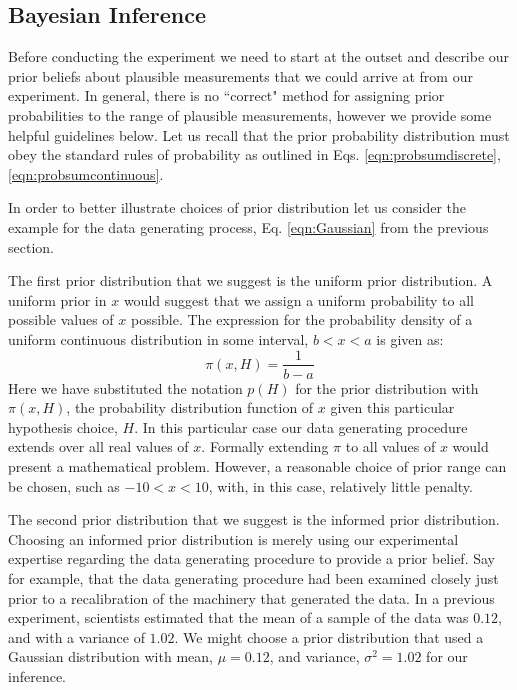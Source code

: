 \subsection{Bayesian Inference}
Before conducting the experiment we need to start at the outset and describe our prior beliefs about plausible measurements that we could arrive at from our experiment. In general, there is no ``correct" method for assigning prior probabilities to the range of plausible measurements, however we provide some helpful guidelines below. Let us recall that the prior probability distribution must obey the standard rules of probability as outlined in Eqs. \ref{eqn:probsumdiscrete}, \ref{eqn:probsumcontinuous}.

In order to better illustrate choices of prior distribution let us consider the example for the data generating process, Eq. \ref{eqn:Gaussian} from the previous section.

The first prior distribution that we suggest is the uniform prior distribution. A uniform prior in $x$ would suggest that we assign a uniform probability to all possible values of $x$ possible. The expression for the probability density of a uniform continuous distribution in some interval, $b < x < a$ is given as:
\begin{equation}
    \pi(x, H) = \frac{1}{b - a}
\end{equation}
Here we have substituted the notation $p(H)$ for the prior distribution with $\pi(x, H)$, the probability distribution function of $x$ given this particular hypothesis choice, $H$. In this particular case our data generating procedure extends over all real values of $x$. Formally extending $\pi$ to all values of $x$ would present a mathematical  problem. However, a reasonable choice of prior range can be chosen, such as $-10 < x < 10$, with, in this case, relatively little penalty.

The second prior distribution that we suggest is the informed prior distribution. Choosing an informed prior distribution is merely using our experimental expertise regarding the data generating procedure to provide a prior belief. Say for example, that the data generating procedure had been examined closely just prior to a recalibration of the machinery that generated the data. In a previous experiment, scientists estimated that the mean of a sample of the data was $0.12$, and with a variance of $1.02$. We might choose a prior distribution that used a Gaussian distribution with mean, $\mu = 0.12$, and variance, $\sigma^2 = 1.02$ for our inference. 

